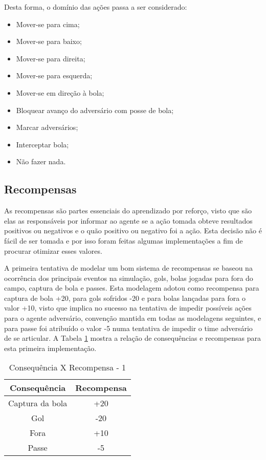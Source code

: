 Desta forma, o domínio das ações passa a ser considerado:

\begin{itemize}
    \item Mover-se para cima;
    \item Mover-se para baixo;
    \item Mover-se para direita;
    \item Mover-se para esquerda;
    \item Mover-se em direção à bola;
    \item Bloquear avanço do adversário com posse de bola;
    \item Marcar adversários;
    \item Interceptar bola;
    \item Não fazer nada.
\end{itemize}

\subsection{Recompensas}\label{rewards}

As recompensas são partes essenciais do aprendizado por reforço, visto que são
elas as responsáveis por informar ao agente se a ação tomada obteve resultados
positivos ou negativos e o quão positivo ou negativo foi a ação. Esta decisão
não é fácil de ser tomada e por isso foram feitas algumas implementações a fim
de procurar otimizar esses valores.

A primeira tentativa de modelar um bom sistema de recompensas se baseou na
ocorrência dos principais eventos na simulação, gols, bolas jogadas para fora do
campo, captura de bola e passes. Esta modelagem adotou como recompensa para
captura de bola +20, para gols sofridos -20 e para bolas lançadas para fora o
valor +10, visto que implica no sucesso na tentativa de impedir possíveis ações para o
agente adversário, convenção mantida em todas as
modelagens seguintes, e para passe foi atribuído o valor -5 numa tentativa de
impedir o time adversário de se articular. A Tabela \ref{tab:rewards1} mostra a
relação de consequências e recompensas para esta primeira implementação.

\begin{table}[hbt]
    \centering
    \begin{tabular}{c|c}
        Consequência    &   Recompensa  \\ \hline
        Captura da bola &   +20 \\
        Gol             &   -20 \\
        Fora            &   +10 \\
        Passe           &   -5  \\
    \end{tabular}
    \caption{Consequência X Recompensa - 1}
    \label{tab:rewards1}
\end{table}

